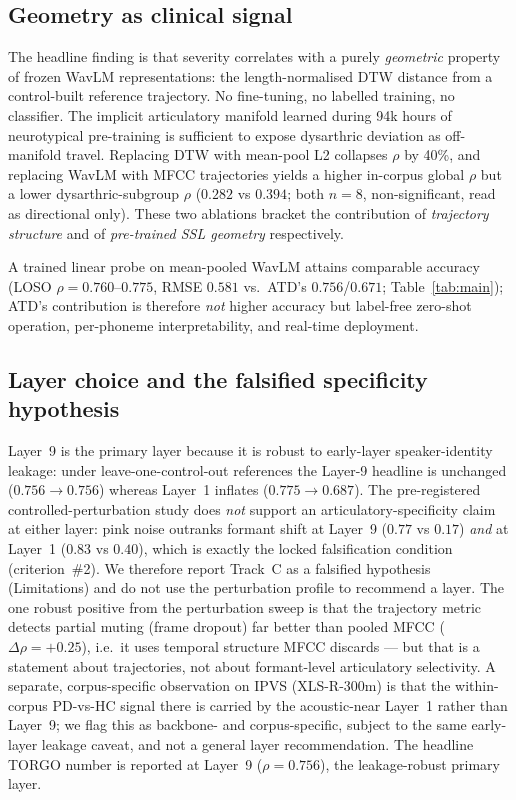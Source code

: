 
\subsection{Geometry as clinical signal}
The headline finding is that severity correlates with a purely
\emph{geometric} property of frozen WavLM representations: the
length-normalised DTW distance from a control-built reference
trajectory. No fine-tuning, no labelled training, no classifier.
The implicit articulatory manifold learned during 94k hours of
neurotypical pre-training is sufficient to expose dysarthric
deviation as off-manifold travel. Replacing DTW with mean-pool L2
collapses $\rho$ by 40\%, and replacing WavLM with MFCC trajectories
yields a higher in-corpus global $\rho$ but a lower dysarthric-subgroup
$\rho$ ($0.282$ vs $0.394$; both $n = 8$, non-significant, read as
directional only). These two ablations bracket the contribution of
\emph{trajectory structure} and of \emph{pre-trained SSL geometry}
respectively.

A trained linear probe on mean-pooled WavLM attains comparable accuracy
(LOSO $\rho = 0.760$--$0.775$, RMSE $0.581$ vs.\ ATD's $0.756$/$0.671$;
Table~\ref{tab:main}); ATD's contribution is therefore \emph{not} higher
accuracy but label-free zero-shot operation, per-phoneme
interpretability, and real-time deployment.

\subsection{Layer choice and the falsified specificity hypothesis}
Layer~9 is the primary layer because it is robust to early-layer
speaker-identity leakage: under leave-one-control-out references the
Layer-9 headline is unchanged ($0.756 \to 0.756$) whereas Layer~1
inflates ($0.775 \to 0.687$). The pre-registered controlled-perturbation
study does \emph{not} support an articulatory-specificity claim at either
layer: pink noise outranks formant shift at Layer~9
($0.77$ vs $0.17$) \emph{and} at Layer~1 ($0.83$ vs $0.40$), which is
exactly the locked falsification condition (criterion~\#2). We therefore
report Track~C as a falsified hypothesis (Limitations) and do not use the
perturbation profile to recommend a layer. The one robust positive from
the perturbation sweep is that the trajectory metric detects partial
muting (frame dropout) far better than pooled MFCC
($\Delta\rho{=}+0.25$), i.e.\ it uses temporal structure MFCC discards ---
but that is a statement about trajectories, not about formant-level
articulatory selectivity. A separate, corpus-specific observation on IPVS
(XLS-R-300m) is that the within-corpus PD-vs-HC signal there is carried by
the acoustic-near Layer~1 rather than Layer~9; we flag this as
backbone- and corpus-specific, subject to the same early-layer leakage
caveat, and not a general layer recommendation. The headline TORGO number
is reported at Layer~9 ($\rho{=}0.756$), the leakage-robust primary
layer.

